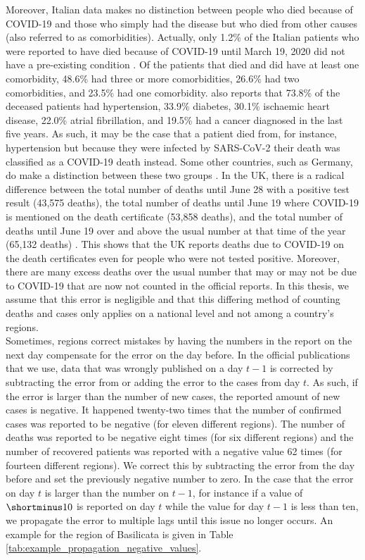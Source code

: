 \documentclass[12pt]{article}
\begin{document}
	Moreover, Italian data makes no distinction between people who died because of COVID-19 and those who simply had the disease but who died from other causes (also referred to as comorbidities). Actually, only 1.2\% of the Italian patients who were reported to have died because of COVID-19 until March 19, 2020 did not have a pre-existing condition \parencite{ecdc2020riskassessment}. Of the patients that died and did have at least one comorbidity, 48.6\% had three or more comorbidities, 26.6\% had two comorbidities, and 23.5\% had one comorbidity. \textcite{ecdc2020riskassessment} also reports that 73.8\% of the deceased patients had hypertension, 33.9\% diabetes, 30.1\% ischaemic heart disease, 22.0\% atrial fibrillation, and 19.5\% had a cancer diagnosed in the last five years. As such, it may be the case that a patient died from, for instance, hypertension but because they were infected by SARS-CoV-2 their death was classified as a COVID-19 death instead. Some other countries, such as Germany, do make a distinction between these two groups  \parencite{otherCountriesDeathsCaccia}. In the UK, there is a radical difference between the total number of deaths until June 28 with a positive test result (43,575 deaths), the total number of deaths until June 19 where COVID-19 is mentioned on the death certificate (53,858 deaths), and the total number of deaths until June 19 over and above the usual number at that time of the year (65,132 deaths) \parencite{bbc2020deathrate}. This shows that the UK reports deaths due to COVID-19 on the death certificates even for people who were not tested positive. Moreover, there are many excess deaths over the usual number that may or may not be due to COVID-19 that are now not counted in the official reports. In this thesis, we assume that this error is negligible and that this differing method of counting deaths and cases only applies on a national level and not among a country's regions. \\
	
	Sometimes, regions correct mistakes by having the numbers in the report on the next day compensate for the error on the day before. In the official publications that we use, data that was wrongly published on a day $t-1$ is corrected by subtracting the error from or adding the error to the cases from day $t$. As such, if the error is larger than the number of new cases, the reported amount of new cases is negative. It happened twenty-two times that the number of confirmed cases was reported to be negative (for eleven different regions). The number of deaths was reported to be negative eight times (for six different regions) and the number of recovered patients was reported with a negative value 62 times (for fourteen different regions). We correct this by subtracting the error from the day before and set the previously negative number to zero. In the case that the error on day $t$ is larger than the number on $t-1$, for instance if a value of $\shortminus10$ is reported on day $t$ while the value for day $t-1$ is less than ten, we propagate the error to multiple lags until this issue no longer occurs. An example for the region of Basilicata is given in Table \ref{tab:example_propagation_negative_values}.
	
\end{document}
